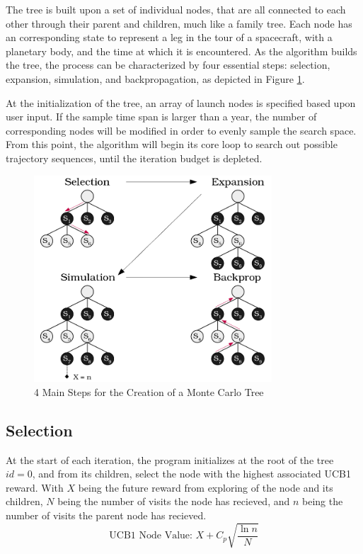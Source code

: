 \documentclass[letterpaper, preprint, paper,11pt]{AAS}	%
\begin{document}
The tree is built upon a set of individual nodes, that are all connected to each other through their parent and children, much like a family tree. Each node has an corresponding state to represent a leg in the tour of a spacecraft, with a planetary body, and the time at which it is encountered. As the algorithm builds the tree, the process can be characterized by four essential steps: selection, expansion, simulation, and backpropagation, as depicted in Figure \ref*{fig:mctsFunc}. 

At the initialization of the tree, an array of launch nodes is specified based upon user input. If the sample time span is larger than a year, the number of corresponding nodes will be modified in order to evenly sample the search space. From this point, the algorithm will begin its core loop to search out possible trajectory sequences, until the iteration budget is depleted. 


\begin{figure}[htb]
	\centering\includegraphics[width=3.5in]{fig/mctsFuncs.png}
	\caption{4 Main Steps for the Creation of a Monte Carlo Tree}
	\label{fig:mctsFunc}
\end{figure}

\subsection{Selection} 
At the start of each iteration, the program initializes at the root of the tree $id = 0$, and from its children, select the node with the highest associated UCB1 reward. With $X$ being the future reward from exploring of the node and its children, $N$ being the number of visits the node has recieved, and $n$ being the number of visits the parent node has recieved. 
\begin{equation}
    \label{eq:UCB1}
    \text{UCB1 Node Value: } X + C_p \sqrt{\frac{\ln{n}}{N}}
\end{equation}
\end{document}
